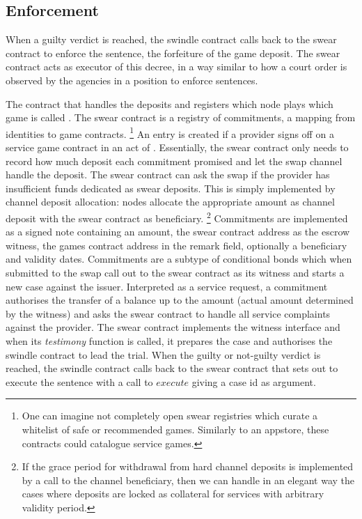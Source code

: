 \subsection{Enforcement}

When a guilty verdict is reached, the swindle contract calls back to the swear contract to enforce the sentence, the forfeiture of the game deposit. The swear contract acts as executor of this decree, in a way similar to how a court order is observed by the agencies in a position to enforce sentences.  

The contract that handles the deposits and registers which node plays which game is called .
The swear contract is a registry of commitments, a mapping from identities to game contracts.%
%
\footnote{One can imagine not completely open swear registries which curate a whitelist of safe or recommended games. Similarly to an appstore, these contracts could catalogue service games.}
%
An entry is created if a provider signs off on a service game contract in an act of . Essentially, the swear contract only needs to record how much deposit each commitment promised and let the swap channel handle the deposit.
The swear contract can  ask the swap if the provider has insufficient funds dedicated as swear deposits. This is simply implemented by channel deposit allocation: nodes allocate the appropriate amount as channel deposit with the swear contract as beneficiary.%
%
\footnote{If the grace period for withdrawal from hard channel deposits is implemented by a call to the channel beneficiary, then we can handle in an elegant way the cases where deposits are locked as collateral for services with arbitrary validity period.}
%
Commitments are implemented as a signed note containing an amount, the swear contract address as the escrow witness, the games contract address in the remark field, optionally a beneficiary and validity dates. Commitments are a subtype of conditional bonds which when submitted to the swap call out to the swear contract as its witness and starts a new case against the issuer. 
Interpreted as a service request, a commitment authorises the transfer of a balance up to the amount (actual amount determined by the witness) and asks the swear contract to handle all service complaints against the provider. The swear contract implements the witness interface and when its \emph{testimony} function is called, it prepares the case and authorises the swindle contract to lead the trial. When the guilty or not-guilty verdict is reached, the swindle contract calls back to the swear contract that sets out to execute the sentence with a call to $execute$ giving a case id as argument.

